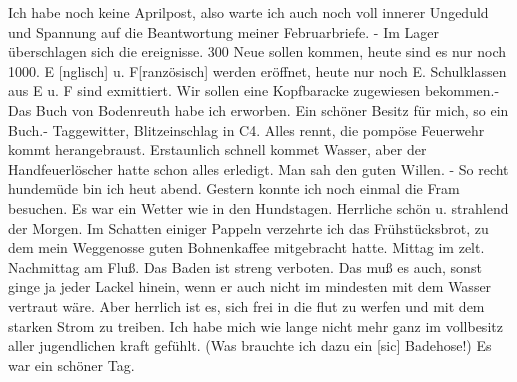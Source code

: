 \def\day{1. Juli 1944.}
\mktitle

Ich habe noch keine Aprilpost, also warte ich auch noch voll innerer Ungeduld und Spannung auf die Beantwortung meiner Februarbriefe.
- Im Lager \"{u}berschlagen sich die ereignisse.
300 Neue sollen kommen, heute sind es nur noch 1000.
E{\color{red} [nglisch] u. F[ranz\"{o}sisch] } werden er\"{o}ffnet, heute nur noch E.
Schulklassen aus E u. F sind exmittiert.
Wir sollen eine Kopfbaracke zugewiesen bekommen.-
Das Buch von Bodenreuth habe ich erworben.
Ein sch\"{o}ner Besitz f\"{u}r mich, so ein Buch.-
Taggewitter, Blitzeinschlag in C4.
Alles rennt, die pomp\"{o}se Feuerwehr kommt herangebraust.
Erstaunlich schnell kommet Wasser, aber der Handfeuerl\"{o}scher hatte schon alles erledigt.
Man sah den guten Willen.
- So recht hundem\"{u}de bin ich heut abend.
Gestern konnte ich noch einmal die Fram besuchen.
Es war ein Wetter wie in den Hundstagen.
Herrliche sch\"{o}n u. strahlend der Morgen.
Im Schatten einiger Pappeln verzehrte ich das Fr\"{u}hst\"{u}cksbrot, zu dem mein Weggenosse guten Bohnenkaffee mitgebracht hatte.
Mittag im zelt.
Nachmittag am Flu{\ss}.
Das Baden ist streng verboten.
Das mu{\ss} es auch, sonst ginge ja jeder Lackel hinein, wenn er auch nicht im mindesten mit dem Wasser vertraut w\"{a}re.
Aber herrlich ist es, sich frei in die flut zu werfen und mit dem starken Strom zu treiben.
Ich habe mich wie lange nicht mehr ganz im vollbesitz aller jugendlichen kraft gef\"{u}hlt.
(Was brauchte ich dazu ein{\color{red} [sic] } Badehose!)
Es war ein sch\"{o}ner Tag.

\clearpage
